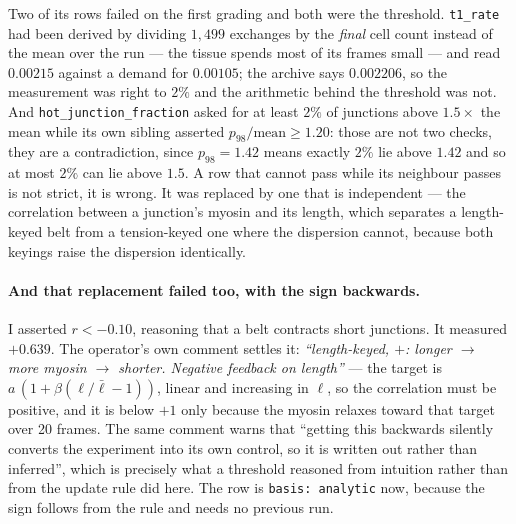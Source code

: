 \documentclass[11pt,a4paper]{article}
\newcommand{\code}[1]{\texttt{\small #1}}
\begin{document}
Two of its rows failed on the first grading and both were the threshold. \code{t1\_rate} had been
derived by dividing $1{,}499$ exchanges by the \emph{final} cell count instead of the mean over the
run --- the tissue spends most of its frames small --- and read $0.00215$ against a demand for
$0.00105$; the archive says $0.002206$, so the measurement was right to $2\%$ and the arithmetic
behind the threshold was not. And \code{hot\_junction\_fraction} asked for at least $2\%$ of
junctions above $1.5\times$ the mean while its own sibling asserted $p_{98}/\text{mean} \ge 1.20$:
those are not two checks, they are a contradiction, since $p_{98} = 1.42$ means exactly $2\%$ lie
above $1.42$ and so at most $2\%$ can lie above $1.5$. A row that cannot pass while its neighbour
passes is not strict, it is wrong. It was replaced by one that is independent --- the correlation
between a junction's myosin and its length, which separates a length-keyed belt from a tension-keyed
one where the dispersion cannot, because both keyings raise the dispersion identically.

\paragraph{And that replacement failed too, with the sign backwards.} I asserted $r < -0.10$,
reasoning that a belt contracts short junctions. It measured $+0.639$. The operator's own comment
settles it: \emph{``length-keyed, $+$: longer $\to$ more myosin $\to$ shorter. Negative feedback on
length''} --- the target is $a\,(1 + \beta(\ell/\bar{\ell} - 1))$, linear and increasing in $\ell$,
so the correlation must be positive, and it is below $+1$ only because the myosin relaxes toward that
target over 20 frames. The same comment warns that ``getting this backwards silently converts the
experiment into its own control, so it is written out rather than inferred'', which is precisely what
a threshold reasoned from intuition rather than from the update rule did here. The row is
\code{basis: analytic} now, because the sign follows from the rule and needs no previous run.
\end{document}
